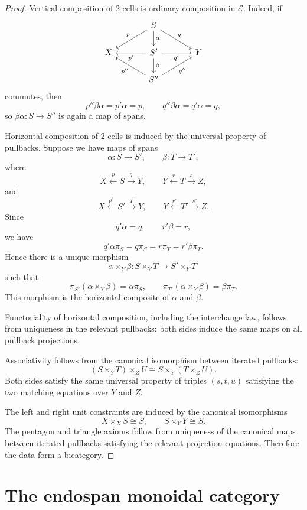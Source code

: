 \begin{proof}
Vertical composition of 2-cells is ordinary composition in \(\mathcal E\). Indeed, if
\[
\begin{tikzcd}[column sep=large]
& S \arrow[dl, "p"'] \arrow[dr, "q"] \arrow[d, "\alpha"] & \\
X & S' \arrow[l, "p'"] \arrow[r, "q'"'] \arrow[d, "\beta"] & Y \\
& S'' \arrow[ul, "p''"] \arrow[ur, "q''"'] &
\end{tikzcd}
\]
commutes, then
\[
p''\beta\alpha=p'\alpha=p,
\qquad
q''\beta\alpha=q'\alpha=q,
\]
so \(\beta\alpha:S\to S''\) is again a map of spans.

Horizontal composition of 2-cells is induced by the universal property of pullbacks. Suppose we have maps of spans
\[
\alpha:S\to S',
\qquad
\beta:T\to T',
\]
where
\[
X \xleftarrow{p} S \xrightarrow{q} Y,
\qquad
Y \xleftarrow{r} T \xrightarrow{s} Z,
\]
and
\[
X \xleftarrow{p'} S' \xrightarrow{q'} Y,
\qquad
Y \xleftarrow{r'} T' \xrightarrow{s'} Z.
\]
Since
\[
q'\alpha=q,
\qquad
r'\beta=r,
\]
we have
\[
q'\alpha\pi_S=q\pi_S=r\pi_T=r'\beta\pi_T.
\]
Hence there is a unique morphism
\[
\alpha\times_Y\beta:S\times_Y T\to S'\times_Y T'
\]
such that
\[
\pi_{S'}(\alpha\times_Y\beta)=\alpha\pi_S,
\qquad
\pi_{T'}(\alpha\times_Y\beta)=\beta\pi_T.
\]
This morphism is the horizontal composite of \(\alpha\) and \(\beta\).

Functoriality of horizontal composition, including the interchange law, follows from uniqueness in the relevant pullbacks: both sides induce the same maps on all pullback projections.

Associativity follows from the canonical isomorphism between iterated pullbacks:
\[
(S\times_Y T)\times_Z U
\cong
S\times_Y(T\times_Z U).
\]
Both sides satisfy the same universal property of triples \((s,t,u)\) satisfying the two matching equations over \(Y\) and \(Z\).

The left and right unit constraints are induced by the canonical isomorphisms
\[
X\times_X S\cong S,
\qquad
S\times_Y Y\cong S.
\]
The pentagon and triangle axioms follow from uniqueness of the canonical maps between iterated pullbacks satisfying the relevant projection equations. Therefore the data form a bicategory.
\end{proof}

\section{The endospan monoidal category}
\label{sec:endospan-monoidal-category}


